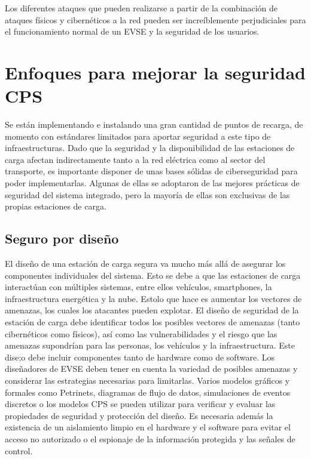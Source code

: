 \documentclass[12pt,a4paper,onecolumn,oneside]{report}
\begin{document}
Los diferentes ataques que pueden realizarse a partir de la combinación de ataques físicos y cibernéticos a la red pueden ser increíblemente perjudiciales para el funcionamiento normal de un EVSE y la seguridad de los usuarios.


\section{Enfoques para mejorar la seguridad CPS}
\label{Enfoques para mejorar la seguridad CPS}

Se están implementando e instalando una gran cantidad de puntos de recarga, de momento con estándares limitados para aportar seguridad a este tipo de infraestructuras. Dado que la seguridad y la disponibilidad de las estaciones de carga afectan indirectamente tanto a la red eléctrica como al sector del transporte, es importante disponer de unas bases sólidas de ciberseguridad para poder implementarlas. Algunas de ellas se adoptaron de las mejores prácticas de seguridad del sistema integrado, pero la mayoría de ellas son exclusivas de las propias estaciones de carga.

\subsection{Seguro por diseño}

El diseño de una estación de carga segura va mucho más allá de asegurar los componentes individuales del sistema. Esto se debe a que las estaciones de carga interactúan con múltiples sistemas, entre ellos vehículos, smartphones, la infraestructura energética y la nube. Estolo que hace es aumentar los vectores de amenazas, los cuales los atacantes pueden explotar. El diseño de seguridad de la estación de carga debe identificar todos los posibles vectores de amenazas (tanto cibernéticos como físicos), así como las vulnerabilidades y el riesgo que las amenazas supondrían para las personas, los vehículos y la infraestructura. Este dise;o debe incluir componentes tanto de hardware como de software. Los diseñadores de EVSE deben tener en cuenta la variedad de posibles amenazas y considerar las estrategias necesarias para limitarlas. Varios modelos gráficos y formales como Petrinets, diagramas de flujo de datos, simulaciones de eventos discretos o los modelos CPS \cite{catorce}\cite{quince}\cite{dieciseis}\cite{diecisiete} se pueden utilizar para verificar y evaluar las propiedades de seguridad y protección del diseño. Es necesaria además la existencia de un aislamiento limpio en el hardware y el software para evitar el acceso no autorizado o el espionaje de la información protegida y las señales de control.
\end{document}
